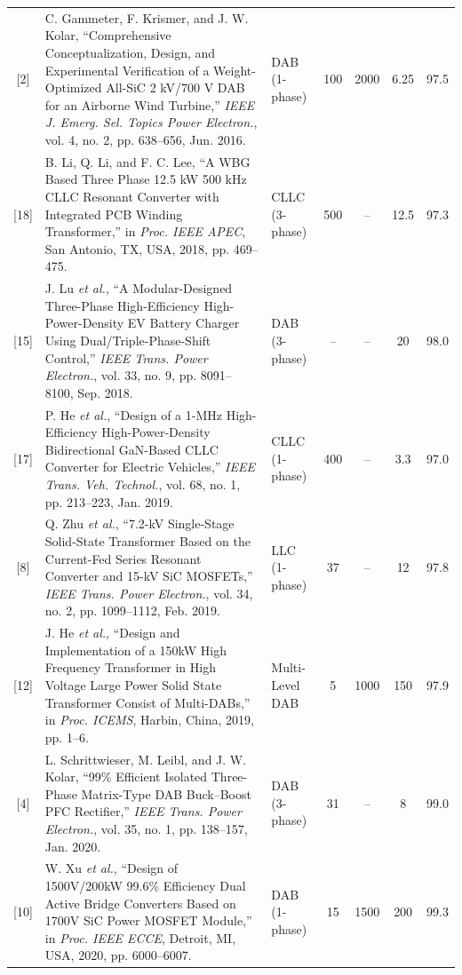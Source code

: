 \begin{longtable}{c p{} l c c c c}
[2] & C. Gammeter, F. Krismer, and J. W. Kolar, ``Comprehensive Conceptualization, Design, and Experimental Verification of a Weight-Optimized All-SiC 2 kV/700 V DAB for an Airborne Wind Turbine,'' \textit{IEEE J. Emerg. Sel. Topics Power Electron.}, vol. 4, no. 2, pp. 638--656, Jun. 2016. & DAB (1-phase) & 100 & 2000 & 6.25 & 97.5 \\

[18] & B. Li, Q. Li, and F. C. Lee, ``A WBG Based Three Phase 12.5 kW 500 kHz CLLC Resonant Converter with Integrated PCB Winding Transformer,'' in \textit{Proc. IEEE APEC}, San Antonio, TX, USA, 2018, pp. 469--475. & CLLC (3-phase) & 500 & -- & 12.5 & 97.3 \\

[15] & J. Lu \textit{et al.}, ``A Modular-Designed Three-Phase High-Efficiency High-Power-Density EV Battery Charger Using Dual/Triple-Phase-Shift Control,'' \textit{IEEE Trans. Power Electron.}, vol. 33, no. 9, pp. 8091--8100, Sep. 2018. & DAB (3-phase) & -- & -- & 20 & 98.0 \\

[17] & P. He \textit{et al.}, ``Design of a 1-MHz High-Efficiency High-Power-Density Bidirectional GaN-Based CLLC Converter for Electric Vehicles,'' \textit{IEEE Trans. Veh. Technol.}, vol. 68, no. 1, pp. 213--223, Jan. 2019. & CLLC (1-phase) & 400 & -- & 3.3 & 97.0 \\

[8] & Q. Zhu \textit{et al.}, ``7.2-kV Single-Stage Solid-State Transformer Based on the Current-Fed Series Resonant Converter and 15-kV SiC MOSFETs,'' \textit{IEEE Trans. Power Electron.}, vol. 34, no. 2, pp. 1099--1112, Feb. 2019. & LLC (1-phase) & 37 & -- & 12 & 97.8 \\

[12] & J. He \textit{et al.}, ``Design and Implementation of a 150kW High Frequency Transformer in High Voltage Large Power Solid State Transformer Consist of Multi-DABs,'' in \textit{Proc. ICEMS}, Harbin, China, 2019, pp. 1--6. & Multi-Level DAB & 5 & 1000 & 150 & 97.9 \\

[4] & L. Schrittwieser, M. Leibl, and J. W. Kolar, ``99\% Efficient Isolated Three-Phase Matrix-Type DAB Buck--Boost PFC Rectifier,'' \textit{IEEE Trans. Power Electron.}, vol. 35, no. 1, pp. 138--157, Jan. 2020. & DAB (3-phase) & 31 & -- & 8 & 99.0 \\

[10] & W. Xu \textit{et al.}, ``Design of 1500V/200kW 99.6\% Efficiency Dual Active Bridge Converters Based on 1700V SiC Power MOSFET Module,'' in \textit{Proc. IEEE ECCE}, Detroit, MI, USA, 2020, pp. 6000--6007. & DAB (1-phase) & 15 & 1500 & 200 & 99.3 \\


\end{longtable}
